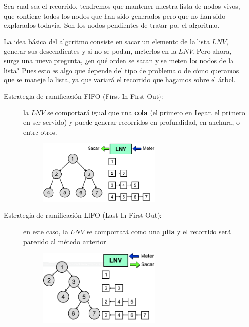 \documentclass[10pt,a4paper,spanish]{report}
\theoremstyle{definition}
\theoremstyle{remark}
\begin{document}
Sea cual sea el recorrido, tendremos que mantener nuestra lista de nodos vivos, que contiene todos los nodos que han sido generados pero que no han sido explorados todavía. Son los nodos pendientes de tratar por el algoritmo.

La idea básica del algoritmo consiste en sacar un elemento de la lista $LNV$, generar sus descendientes y si no se podan, meterlos en la $LNV$. Pero ahora, surge una nueva pregunta, ¿en qué orden se sacan y se meten los nodos de la lista? Pues esto es algo que depende del tipo de problema o de cómo queramos que se maneje la lista, ya que variará el recorrido que hagamos sobre el árbol.

\begin{description}
    \item [Estrategia de ramificación FIFO (First-In-First-Out):] la $LNV$ se comportará igual que una \textbf{\textcolor{coquelicot}cola} (el primero en llegar, el primero en ser servido) y puede generar recorridos en profundidad, en anchura, o entre otros.
    \begin{figure}[!h]
        \centering
        \includegraphics[width=0.6\textwidth]{fifo}
    \end{figure}
    \item [Estrategia de ramificación LIFO (Last-In-First-Out):] en este caso, la $LNV$ se comportará como una \textbf{\textcolor{coquelicot}pila} y el recorrido será parecido al método anterior.
    \begin{figure}[!h]
        \centering
        \includegraphics[width=0.6\textwidth]{lifo}
    \end{figure}


\end{description}
\end{document}
